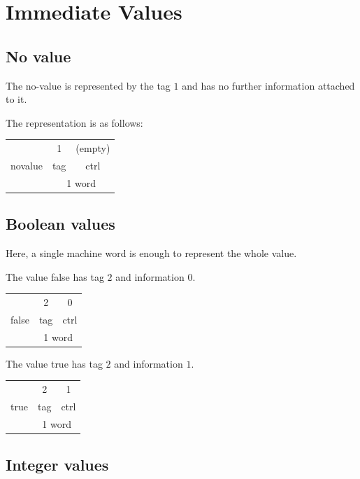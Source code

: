 \documentclass[a4paper,11pt]{article}
\newcommand{\code}[1]{\textsf{#1}}
\begin{document}
\section{Immediate Values}

\subsection{No value}

The no-value is represented by the tag $1$ and has no further information attached to it.

The representation is as follows:

\begin{tabular}{|c|c|c|}
\hline
\multirow{3}{*}{\code{novalue}} & 1 & (empty) \\
\cline{2-3}
& \code{tag} & \code{ctrl} \\
\cline{2-3}
& \multicolumn{2}{|c|}{1 word} \\
\hline
\end{tabular}


\subsection{Boolean values}

Here, a single machine word is enough to represent the whole value.

The value false has tag $2$ and information $0$.

\begin{tabular}{|c|c|c|}
\hline
\multirow{3}{*}{\code{false}} & 2 & 0 \\
\cline{2-3}
& \code{tag} & \code{ctrl} \\
\cline{2-3}
& \multicolumn{2}{|c|}{1 word} \\
\hline
\end{tabular}

The value true has tag $2$ and information $1$.

\begin{tabular}{|c|c|c|}
\hline
\multirow{3}{*}{\code{true}} & 2 & 1 \\
\cline{2-3}
& \code{tag} & \code{ctrl} \\
\cline{2-3}
& \multicolumn{2}{|c|}{1 word} \\
\hline
\end{tabular}


\subsection{Integer values}
\end{document}

